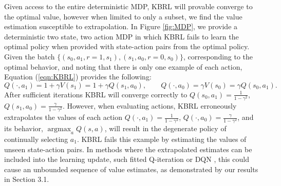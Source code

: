 \documentclass{article}
\newcommand{\y}{\gamma}
\DeclareMathOperator*{\argmax}{argmax}
\begin{document}
Given access to the entire deterministic MDP, KBRL will provable converge to the optimal value, however when limited to only a subset, we find the value estimation susceptible to extrapolation.  
In Figure \ref{fig:MDP}, we provide a deterministic two state, two action MDP in which KBRL fails to learn the optimal policy when provided with state-action pairs from the optimal policy. Given the batch $\{ (s_0, a_1, r=1, s_1), (s_1, a_0, r=0, s_0) \}$, corresponding to the optimal behavior, and noting that there is only one example of each action, Equation (\ref{eqn:KBRL}) provides the following: 
\begin{equation} \label{eqn:KBRL_updates}
Q(\cdot, a_1) = 1 + \y V(s_1) = 1 + \y Q(s_1,a_0), \qquad  Q(\cdot, a_0) = \y V(s_0) = \y Q(s_0,a_1).
\end{equation}
After sufficient iterations KBRL will converge correctly to $Q(s_0, a_1) = \frac{1}{1 - \y^2}$, $Q(s_1, a_0) = \frac{\y}{1 - \y^2}$. However, when evaluating actions, KBRL erroneously extrapolates the values of each action $Q(\cdot, a_1) = \frac{1}{1 - \y^2}$, $Q(\cdot, a_0) = \frac{\y}{1 - \y^2}$, and its behavior, $\argmax_a Q(s,a)$, will result in the degenerate policy of continually selecting $a_1$. KBRL fails this example by estimating the values of unseen state-action pairs. In methods where the extrapolated estimates can be included into the learning update, such fitted Q-iteration or DQN \citep{ernst2005tree,DQN}, this could cause an unbounded sequence of value estimates, as demonstrated by our results in Section 3.1.


%
 
\end{document}
